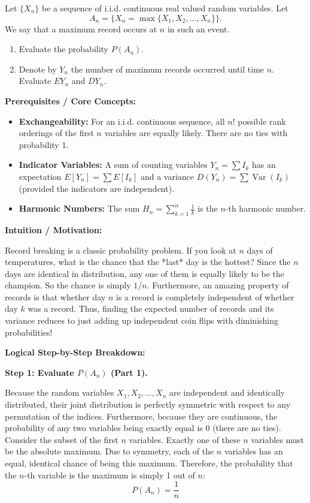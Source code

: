 \begin{exercise}
\label{probability:2013:3}
Let $\{X_n\}$ be a sequence of i.i.d. continuous real valued random variables. Let
\[ A_n = \{X_n = \max\{X_1, X_2, \dots, X_n\}\}. \]
We say that a maximum record occurs at $n$ in such an event.
\begin{enumerate}
    \item Evaluate the probability $P(A_n)$.
    \item Denote by $Y_n$ the number of maximum records occurred until time $n$. Evaluate $EY_n$ and $DY_n$.
\end{enumerate}
\end{exercise}

\begin{solution}
\textbf{Prerequisites / Core Concepts:}
\begin{itemize}
    \item \textbf{Exchangeability:} For an i.i.d. continuous sequence, all $n!$ possible rank orderings of the first $n$ variables are equally likely. There are no ties with probability 1.
    \item \textbf{Indicator Variables:} A sum of counting variables $Y_n = \sum I_k$ has an expectation $E[Y_n] = \sum E[I_k]$ and a variance $D(Y_n) = \sum \operatorname{Var}(I_k)$ (provided the indicators are independent).
    \item \textbf{Harmonic Numbers:} The sum $H_n = \sum_{k=1}^n \frac{1}{k}$ is the $n$-th harmonic number.
\end{itemize}

\textbf{Intuition / Motivation:}

Record breaking is a classic probability problem. If you look at $n$ days of temperatures, what is the chance that the *last* day is the hottest? Since the $n$ days are identical in distribution, any one of them is equally likely to be the champion. So the chance is simply $1/n$. Furthermore, an amazing property of records is that whether day $n$ is a record is completely independent of whether day $k$ was a record. Thus, finding the expected number of records and its variance reduces to just adding up independent coin flips with diminishing probabilities!

\textbf{Logical Step-by-Step Breakdown:}

\textbf{Step 1: Evaluate $P(A_n)$ (Part 1).}

Because the random variables $X_1, X_2, \dots, X_n$ are independent and identically distributed, their joint distribution is perfectly symmetric with respect to any permutation of the indices.
Furthermore, because they are continuous, the probability of any two variables being exactly equal is 0 (there are no ties).
Consider the subset of the first $n$ variables. Exactly one of these $n$ variables must be the absolute maximum. Due to symmetry, each of the $n$ variables has an equal, identical chance of being this maximum.
Therefore, the probability that the $n$-th variable is the maximum is simply 1 out of $n$:
\[ P(A_n) = \frac{1}{n} \]


\end{solution}
